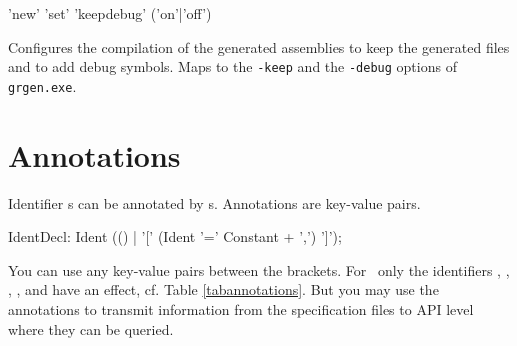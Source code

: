 \begin{rail}
  'new' 'set' 'keepdebug' ('on'|'off')
\end{rail}
Configures the compilation of the generated assemblies to keep the generated files and to add debug symbols.
Maps to the \texttt{-keep} and the \texttt{-debug} options of \texttt{grgen.exe}.


\section{Annotations}
\label{annotations}

Identifier s can be annotated by s. 
Annotations are key-value pairs.
\begin{rail}
  IdentDecl: Ident (() | '[' (Ident '=' Constant + ',') ']');
\end{rail}
You can use any key-value pairs between the brackets.
For \GrG\ only the identifiers , , , , and  have an effect, cf. Table \ref{tabannotations}.
But you may use the annotations to transmit information from the specification files to API level where they can be queried.

\pagebreak %

